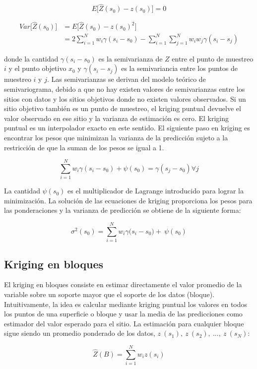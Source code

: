 \documentclass[11pt,b5paper,]{krantz}
\begin{document}
\[E\big[\hat{Z}(s_0)-z(s_0)\big]=0\]

\begin{align*}
Var\big[\hat{Z}(s_0) \big] & = E\big[\hat{Z}(s_0) - z(s_0)^2 \big] \\&= 2\sum_{i=1}^{N}{w_i\gamma(s_i-s_0)-\sum_{i=1}^{N}\sum_{j=1}^{N}{w_iw_j\gamma(s_i-s_j)}}
\end{align*}

donde la cantidad \(\gamma(s_i - s_0)\) es la semivarianza de \(Z\)
entre el punto de muestreo \(i\) y el punto objetivo \(x_0\) y
\(\gamma(s_i - s_j)\) es la semivariancia entre los puntos de muestreo
\(i\) y \(j\). Las semivarianzas se derivan del modelo teórico de
semivariograma, debido a que no hay existen valores de semivarianzas
entre los sitios con datos y los sitios objetivos donde no existen
valores observados. Si un sitio objetivo también es un punto de
muestreo, el kriging puntual devuelve el valor observado en ese sitio y
la varianza de estimación es cero. El kriging puntual es un interpolador
exacto en este sentido. El siguiente paso en kriging es encontrar los
pesos que minimizan la varianza de la predicción sujeto a la restricción
de que la suman de los pesos se igual a 1.

\[\sum_{i=1}^{N}w_i\gamma(s_i-s_0)+\psi(s_0)=\gamma(s_j-s_0) \forall j\]

La cantidad \(\psi (s_0)\) es el multiplicador de Lagrange introducido
para lograr la minimización. La solución de las ecuaciones de kriging
proporciona los pesos para las ponderaciones y la varianza de predicción
se obtiene de la siguiente forma:

\[\sigma^2(s_0)=\sum_{i=1}^{N}{w_i\gamma(}s_i-s_0)+\ \psi(s_0)\]

\subsection{Kriging en bloques}\label{kriging-en-bloques}

El kriging en bloques consiste en estimar directamente el valor promedio
de la variable sobre un soporte mayor que el soporte de los datos
(bloque). Intuitivamente, la idea es calcular mediante kriging puntual
los valores en todos los puntos de una superficie o bloque y usar la
media de las predicciones como estimador del valor esperado para el
sitio. La estimación para cualquier bloque sigue siendo un promedio
ponderado de los datos, \(z\ (s_1),\ z\ (s_2),\ ...,\ z\ (s_N)\):

\[\hat{Z}(B)=\sum_{i=1}^{N}{w_iz(s_i)}\]
\end{document}
